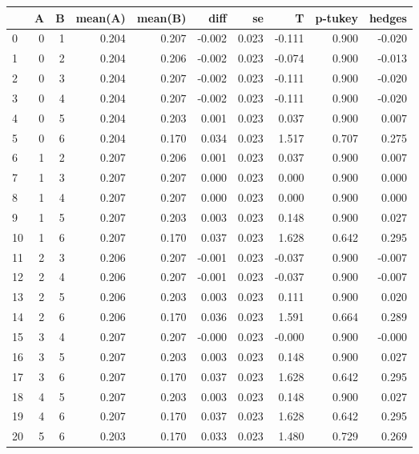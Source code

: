 \begin{tabular}{lrrrrrrrrr}
\toprule
{} &  A &  B &  mean(A) &  mean(B) &   diff &     se &      T &  p-tukey &  hedges \\
\midrule
0  &  0 &  1 &    0.204 &    0.207 & -0.002 &  0.023 & -0.111 &    0.900 &  -0.020 \\
1  &  0 &  2 &    0.204 &    0.206 & -0.002 &  0.023 & -0.074 &    0.900 &  -0.013 \\
2  &  0 &  3 &    0.204 &    0.207 & -0.002 &  0.023 & -0.111 &    0.900 &  -0.020 \\
3  &  0 &  4 &    0.204 &    0.207 & -0.002 &  0.023 & -0.111 &    0.900 &  -0.020 \\
4  &  0 &  5 &    0.204 &    0.203 &  0.001 &  0.023 &  0.037 &    0.900 &   0.007 \\
5  &  0 &  6 &    0.204 &    0.170 &  0.034 &  0.023 &  1.517 &    0.707 &   0.275 \\
6  &  1 &  2 &    0.207 &    0.206 &  0.001 &  0.023 &  0.037 &    0.900 &   0.007 \\
7  &  1 &  3 &    0.207 &    0.207 &  0.000 &  0.023 &  0.000 &    0.900 &   0.000 \\
8  &  1 &  4 &    0.207 &    0.207 &  0.000 &  0.023 &  0.000 &    0.900 &   0.000 \\
9  &  1 &  5 &    0.207 &    0.203 &  0.003 &  0.023 &  0.148 &    0.900 &   0.027 \\
10 &  1 &  6 &    0.207 &    0.170 &  0.037 &  0.023 &  1.628 &    0.642 &   0.295 \\
11 &  2 &  3 &    0.206 &    0.207 & -0.001 &  0.023 & -0.037 &    0.900 &  -0.007 \\
12 &  2 &  4 &    0.206 &    0.207 & -0.001 &  0.023 & -0.037 &    0.900 &  -0.007 \\
13 &  2 &  5 &    0.206 &    0.203 &  0.003 &  0.023 &  0.111 &    0.900 &   0.020 \\
14 &  2 &  6 &    0.206 &    0.170 &  0.036 &  0.023 &  1.591 &    0.664 &   0.289 \\
15 &  3 &  4 &    0.207 &    0.207 & -0.000 &  0.023 & -0.000 &    0.900 &  -0.000 \\
16 &  3 &  5 &    0.207 &    0.203 &  0.003 &  0.023 &  0.148 &    0.900 &   0.027 \\
17 &  3 &  6 &    0.207 &    0.170 &  0.037 &  0.023 &  1.628 &    0.642 &   0.295 \\
18 &  4 &  5 &    0.207 &    0.203 &  0.003 &  0.023 &  0.148 &    0.900 &   0.027 \\
19 &  4 &  6 &    0.207 &    0.170 &  0.037 &  0.023 &  1.628 &    0.642 &   0.295 \\
20 &  5 &  6 &    0.203 &    0.170 &  0.033 &  0.023 &  1.480 &    0.729 &   0.269 \\
\bottomrule
\end{tabular}
